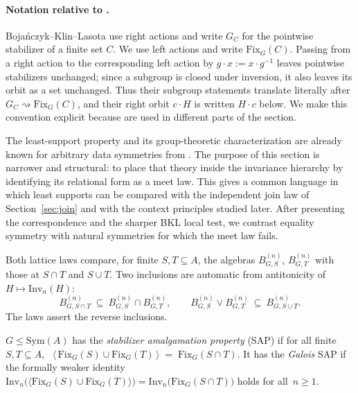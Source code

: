 \documentclass{lmcs}
\newcommand{\Sym}{\mathrm{Sym}}
\newcommand{\Fix}{\mathrm{Fix}}
\newcommand{\Inv}{\mathrm{Inv}}
\begin{document}
\paragraph{Notation relative to \cite{BKL14}.}
Boja\'nczyk--Klin--Lasota use right actions and write $G_C$ for the
pointwise stabilizer of a finite set $C$. We use left actions and write
$\Fix_G(C)$. Passing from a right action to the corresponding left action
by $g\cdot x:=x\cdot g^{-1}$ leaves pointwise stabilizers unchanged; since a
subgroup is closed under inversion, it also leaves its orbit as a set
unchanged. Thus their subgroup statements translate literally after
$G_C\rightsquigarrow\Fix_G(C)$, and their right orbit $c\cdot H$ is written
$H\cdot c$ below. We make this convention explicit because
\cite[Fact~9.2 and Thm.~9.3]{BKL14} are used in different parts of the
section.

The least-support property and its group-theoretic characterization are already known for arbitrary data symmetries from \cite{BKL14}. The purpose of this section is narrower and structural: to place that theory inside the invariance hierarchy by identifying its relational form as a meet law. This gives a common language in which least supports can be compared with the independent join law of Section~\ref{sec:join} and with the context principles studied later. After presenting the correspondence and the sharper BKL local test, we contrast equality symmetry with natural symmetries for which the meet law fails.

Both lattice laws compare, for finite $S,T\subseteq A$, the algebras
$B^{(n)}_{G,S}$, $B^{(n)}_{G,T}$ with those at $S\cap T$ and
$S\cup T$. Two inclusions are automatic from antitonicity of
$H\mapsto\Inv_n(H)$:
\begin{equation}\label{eq:trivial}
B^{(n)}_{G,S\cap T}\ \subseteq\ B^{(n)}_{G,S}\cap B^{(n)}_{G,T},
\qquad
B^{(n)}_{G,S}\vee B^{(n)}_{G,T}\ \subseteq\ B^{(n)}_{G,S\cup T}.
\end{equation}
The laws assert the reverse inclusions.

\begin{defi}\label{def:sap}
$G\leq\Sym(A)$ has the \emph{stabilizer amalgamation property}
(\textup{SAP}) if for all finite $S,T\subseteq A$, \ $\bigl\langle\,\Fix_G(S)\cup\Fix_G(T)\,\bigr\rangle\;=\;\Fix_G(S\cap T)$.
It has the \emph{Galois} \textup{SAP} if the formally weaker identity
$\Inv_n\bigl(\langle\Fix_G(S)\cup\Fix_G(T)\rangle\bigr)
=\Inv_n\bigl(\Fix_G(S\cap T)\bigr)$ holds for all~$n\geq1$.
\end{defi}
\end{document}
